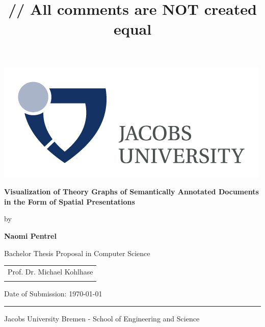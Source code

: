 \documentclass[twoside]{article}
\title{\vspace{-15mm}\fontsize{24pt}{10pt}\selectfont\textbf{// All comments are NOT created equal}} %
\begin{document}
\thispagestyle{empty}
\begin{flushright}
    \includegraphics[scale=0.7]{Logo}
  \end{flushright}
  \vspace{20mm}
  \begin{center}
    \huge
    \textbf{Visualization of Theory Graphs of Semantically Annotated Documents in the Form of Spatial Presentations}
  \end{center}
  \vspace*{4mm}
  \begin{center}
   \Large by
  \end{center}
  \vspace*{4mm}
  \begin{center}
    \Large
    \textbf{Naomi Pentrel}
  \end{center}
  \vspace*{20mm}
  \begin{center}
    \large
    Bachelor Thesis Proposal in Computer Science
  \end{center}
  \vfill
  \begin{flushright}
    \large
    \begin{tabular}{l}
      
      \hline
      Prof. Dr. Michael Kohlhase \\
      \\
    \end{tabular}
  \end{flushright}
  \vspace*{8mm}
  \begin{flushleft}
    \large
    Date of Submission: \today \\
    \rule{\textwidth}{1pt}
  \end{flushleft}
  \begin{center}
    \Large Jacobs University Bremen - School of Engineering and Science
  \end{center}
\end{document}
